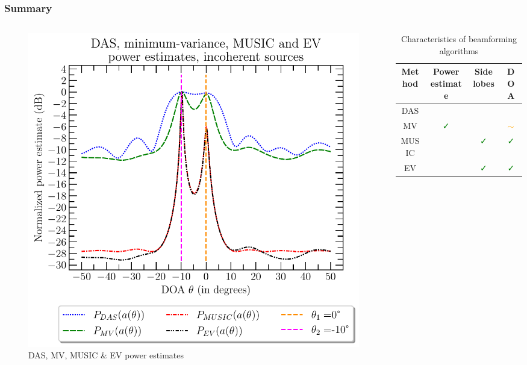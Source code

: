\documentclass[UKenglish,8pt,aspectratio=1610]{beamer}
\begin{document}
\begin{frame}
	\frametitle{Summary}
		\begin{columns}
		\begin{column}{0.5\textwidth}
			\begin{figure}[h!]
				\centering
				\includegraphics[scale=0.4]{question7/part_A_question_7_all.pdf}
				\caption{DAS, MV, MUSIC \& EV power estimates}
			\end{figure}
		\end{column}
		\begin{column}{0.5\textwidth}
		\begin{table}[h!]
			\begin{tabular}{cccc}
				\hline
				Method&Power estimate&Side lobes&DOA\\
				\hline
				\hline
				DAS&\textcolor{red}{\faTimes}&\textcolor{red}{\faTimes}&\textcolor{red}{\faTimes}\\
				MV&\textcolor{green}{\faCheck}&\textcolor{red}{\faTimes}&\textcolor{orange}{$\sim$}\\
				MUSIC&\textcolor{red}{\faTimes}&\textcolor{green}{\faCheck}&\textcolor{green}{\faCheck}\\
				EV&\textcolor{red}{\faTimes}&\textcolor{green}{\faCheck}&\textcolor{green}{\faCheck}\\
				\hline
			\end{tabular}
		\centering
		\caption{Characteristics of beamforming algorithms}

\end{table}
\end{column}
\end{columns}
\end{frame}
\end{document}
